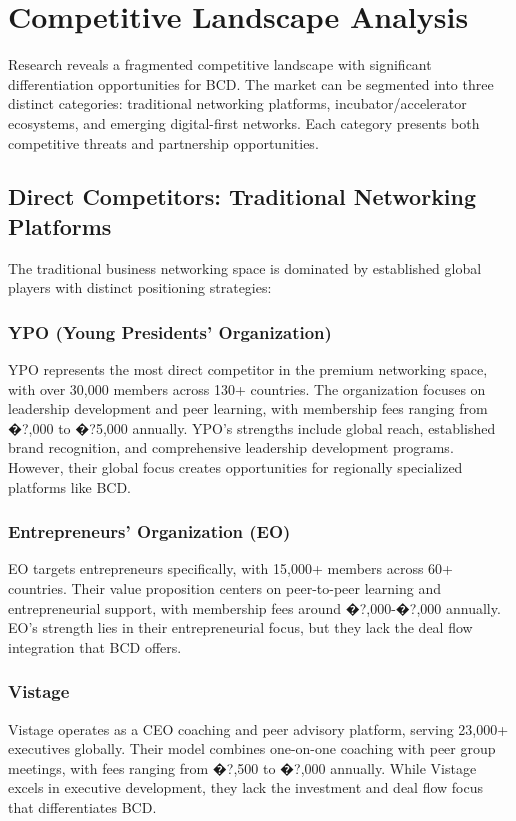 \section{Competitive Landscape Analysis}

Research reveals a fragmented competitive landscape with significant differentiation opportunities for BCD. The market can be segmented into three distinct categories: traditional networking platforms, incubator/accelerator ecosystems, and emerging digital-first networks. Each category presents both competitive threats and partnership opportunities.

\subsection{Direct Competitors: Traditional Networking Platforms}

The traditional business networking space is dominated by established global players with distinct positioning strategies:

\subsubsection{YPO (Young Presidents' Organization)}
YPO represents the most direct competitor in the premium networking space, with over 30,000 members across 130+ countries. The organization focuses on leadership development and peer learning, with membership fees ranging from �?,000 to �?5,000 annually. YPO's strengths include global reach, established brand recognition, and comprehensive leadership development programs. However, their global focus creates opportunities for regionally specialized platforms like BCD.

\subsubsection{Entrepreneurs' Organization (EO)}
EO targets entrepreneurs specifically, with 15,000+ members across 60+ countries. Their value proposition centers on peer-to-peer learning and entrepreneurial support, with membership fees around �?,000-�?,000 annually. EO's strength lies in their entrepreneurial focus, but they lack the deal flow integration that BCD offers.

\subsubsection{Vistage}
Vistage operates as a CEO coaching and peer advisory platform, serving 23,000+ executives globally. Their model combines one-on-one coaching with peer group meetings, with fees ranging from �?,500 to �?,000 annually. While Vistage excels in executive development, they lack the investment and deal flow focus that differentiates BCD.


